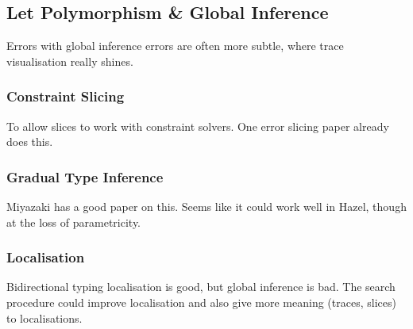 \subsection{Let Polymorphism \& Global Inference}
Errors with global inference errors are often more subtle, where trace visualisation really shines. 
\subsubsection{Constraint Slicing}
To allow slices to work with constraint solvers. One error slicing paper already does this.

\subsubsection{Gradual Type Inference}
Miyazaki has a good paper on this. Seems like it could work well in Hazel, though at the loss of parametricity.

\subsubsection{Localisation}
Bidirectional typing localisation is good, but global inference is bad. The search procedure could improve localisation and also give more meaning (traces, slices) to localisations.